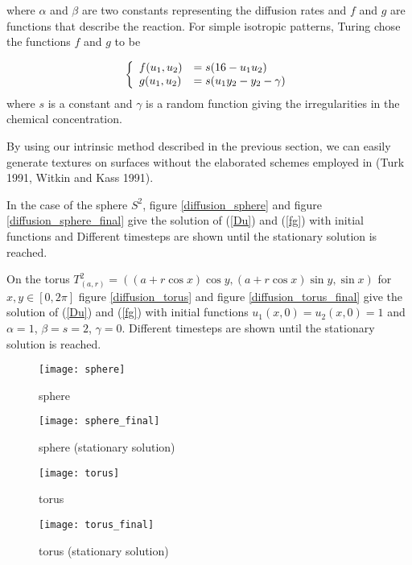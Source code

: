 \documentclass{elsart}
\begin{document}
where $\alpha$ and $\beta$ are two constants representing the
diffusion rates and $f$ and $g$ are functions that describe the
reaction. For simple isotropic patterns, Turing chose the functions
$f$ and $g$ to be

\begin{equation}\label{fg} \left \{ \begin{array}{ll}
f(u_1,u_2) &= s(16-u_1u_2) \cr g(u_1,u_2) & = s(u_1y_2-y_2-\gamma)
\end{array}\right. \end{equation}
where $s$ is a constant and $\gamma$ is a random function giving the
irregularities in the chemical concentration.

    By using our intrinsic method described in the previous section, we
can easily generate textures on surfaces without the elaborated
schemes employed in (Turk 1991, Witkin and Kass 1991).

In the case of the sphere $S^2$, figure \ref{diffusion_sphere} and
figure \ref{diffusion_sphere_final} give the solution of (\ref{Du})
and (\ref{fg}) with initial functions and Different timesteps are
shown until the stationary solution is reached.


On the torus $T^2_{(a,r)} = ( ( a+r \cos x)\cos y, (a+r \cos x)\sin
y, \sin x)$ for $x,y \in [ 0, 2\pi]$ figure \ref{diffusion_torus}
and figure \ref{diffusion_torus_final} give the solution of
(\ref{Du}) and (\ref{fg}) with initial functions $u_1(x,0) =
u_2(x,0) = 1$ and $ \alpha = 1$, $\beta = s = 2$, $\gamma = 0$.
Different timesteps are shown until the stationary solution is
reached.



\begin{figure}
{\center
\texttt{[image: sphere]}
\caption{sphere}\label{sphere}
 }
\end{figure}


\begin{figure}
{\center
\texttt{[image: sphere\_final]}
\caption{sphere (stationary solution) }\label{shpere_final}
 }
\end{figure}







\begin{figure}
{\center
\texttt{[image: torus]}
\caption{torus}\label{torus}
 }
\end{figure}

\begin{figure}
{\center
\texttt{[image: torus\_final]}
\caption{torus (stationary solution)}\label{torus_final}
 }
\end{figure}
\end{document}
